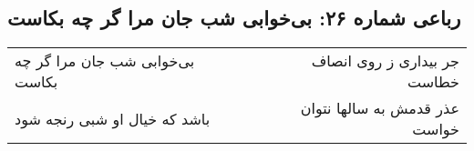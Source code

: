 \begin{center}
\section*{رباعی شماره ۲۶: بی‌خوابی شب جان مرا گر چه بکاست}
\label{sec:sh026}
\begin{longtable}{l p{0.5cm} r}
بی‌خوابی شب جان مرا گر چه بکاست
&&
جر بیداری ز روی انصاف خطاست
\\
باشد که خیال او شبی رنجه شود
&&
عذر قدمش به سالها نتوان خواست
\\
\end{longtable}
\end{center}
